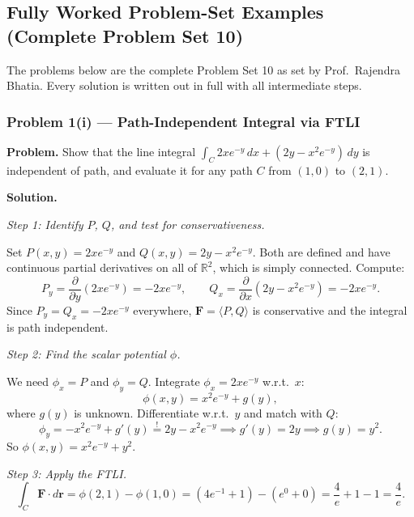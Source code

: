 \documentclass[11pt]{article}
\begin{document}
\subsection{Fully Worked Problem-Set Examples (Complete Problem Set 10)}

The problems below are the complete Problem Set 10 as set by Prof.\ Rajendra Bhatia.
Every solution is written out in full with all intermediate steps.

\subsubsection*{Problem 1(i) --- Path-Independent Integral via FTLI}

\textbf{Problem.}
Show that the line integral
$\int_C 2xe^{-y}\,dx + (2y - x^2 e^{-y})\,dy$
is independent of path, and evaluate it for any path $C$ from $(1,0)$ to $(2,1)$.

\medskip
\textbf{Solution.}

\textit{Step 1: Identify $P$, $Q$, and test for conservativeness.}

Set $P(x,y) = 2xe^{-y}$ and $Q(x,y) = 2y - x^2 e^{-y}$.
Both are defined and have continuous partial derivatives on all of $\mathbb{R}^2$, which is simply connected. Compute:
\[
  P_y = \frac{\partial}{\partial y}(2xe^{-y}) = -2xe^{-y},
  \qquad
  Q_x = \frac{\partial}{\partial x}(2y - x^2e^{-y}) = -2xe^{-y}.
\]
Since $P_y = Q_x = -2xe^{-y}$ everywhere, $\mathbf{F} = \langle P,Q\rangle$ is conservative and the integral is path independent.

\textit{Step 2: Find the scalar potential $\phi$.}

We need $\phi_x = P$ and $\phi_y = Q$. Integrate $\phi_x = 2xe^{-y}$ w.r.t.\ $x$:
\[
  \phi(x,y) = x^2 e^{-y} + g(y),
\]
where $g(y)$ is unknown. Differentiate w.r.t.\ $y$ and match with $Q$:
\[
  \phi_y = -x^2 e^{-y} + g'(y) \stackrel{!}{=} 2y - x^2 e^{-y}
  \implies g'(y) = 2y \implies g(y) = y^2.
\]
So $\phi(x,y) = x^2 e^{-y} + y^2$.

\textit{Step 3: Apply the FTLI.}
\[
  \int_C \mathbf{F}\cdot d\mathbf{r}
  = \phi(2,1) - \phi(1,0)
  = (4e^{-1} + 1) - (e^0 + 0)
  = \frac{4}{e} + 1 - 1
  = \boxed{\dfrac{4}{e}}.
\]

\bigskip
\end{document}
